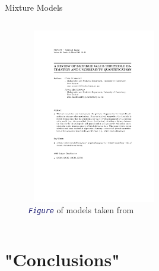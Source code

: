 \documentclass[9pt,xcolor={dvipsnames}]{beamer}
\begin{document}
\begin{frame}{Mixture Models}
\begin{columns}[T]
\begin{column}{.55\textwidth}
	 	\begin{figure}	
%	
	  \includegraphics[trim={4.5cm 3.3cm 
	  	5cm 8.3cm},clip,width=2.3in,height=3in, page = 16]{mac.pdf}
\vspace{-4.5mm}
\caption{\fontsize{1}{1}\selectfont
\textcolor{MidnightBlue}{\emph{\texttt{Figure}}} of models taken from \textcolor{JungleGreen}{\cite{scarrott_review_2012}}}
	\end{figure}
	
\end{column}
	\end{columns}
\end{frame}


\section{"Conclusions"}
\end{document}
